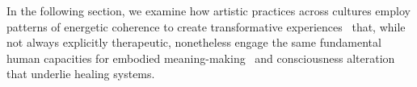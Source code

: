 In the following section, we examine how artistic practices across cultures employ patterns of energetic coherence to create transformative experiences~ that, while not always explicitly therapeutic, nonetheless engage the same fundamental human capacities for embodied meaning-making~ and consciousness alteration that underlie healing systems.

